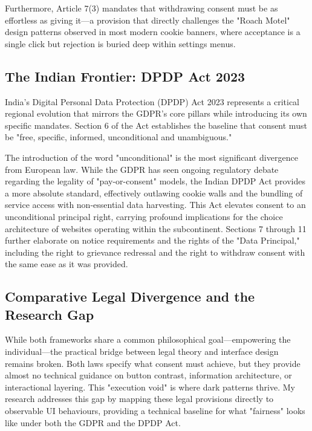 \documentclass[12pt,a4paper]{report}
\begin{document}
Furthermore, Article 7(3) mandates that withdrawing consent must be as effortless as giving it—a provision that directly challenges the "Roach Motel" design patterns observed in most modern cookie banners, where acceptance is a single click but rejection is buried deep within settings menus.

\subsection{The Indian Frontier: DPDP Act 2023}

India’s Digital Personal Data Protection (DPDP) Act 2023 represents a critical regional evolution that mirrors the GDPR’s core pillars while introducing its own specific mandates. Section 6 of the Act establishes the baseline that consent must be "free, specific, informed, unconditional and unambiguous." 

The introduction of the word "unconditional" is the most significant divergence from European law. While the GDPR has seen ongoing regulatory debate regarding the legality of "pay-or-consent" models, the Indian DPDP Act provides a more absolute standard, effectively outlawing cookie walls and the bundling of service access with non-essential data harvesting. This Act elevates consent to an unconditional principal right, carrying profound implications for the choice architecture of websites operating within the subcontinent. Sections 7 through 11 further elaborate on notice requirements and the rights of the "Data Principal," including the right to grievance redressal and the right to withdraw consent with the same ease as it was provided.

\subsection{Comparative Legal Divergence and the Research Gap}

While both frameworks share a common philosophical goal—empowering the individual—the practical bridge between legal theory and interface design remains broken. Both laws specify what consent must achieve, but they provide almost no technical guidance on button contrast, information architecture, or interactional layering. This "execution void" is where dark patterns thrive. My research addresses this gap by mapping these legal provisions directly to observable UI behaviours, providing a technical baseline for what "fairness" looks like under both the GDPR and the DPDP Act.
\end{document}
